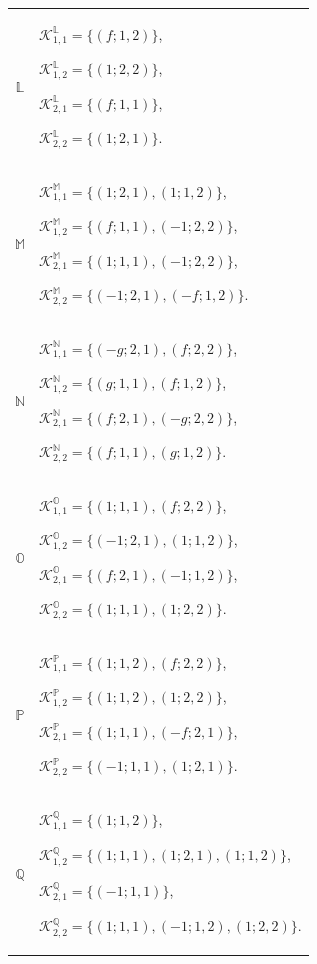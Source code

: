 \documentclass{amsart}
\theoremstyle{definition}
\theoremstyle{remark}
\numberwithin{equation}{section}
\begin{document}
\begin{center}
\begin{longtable}{c|p{}}
$\mathbb{L}$ &
$\mathscr{K}_{1,1}^{\mathbb{L}}=\{(f;1,2)\}$,

$\mathscr{K}_{1,2}^{\mathbb{L}}=\{(1;2,2)\}$,

$\mathscr{K}_{2,1}^{\mathbb{L}}=\{(f;1,1)\}$,

$\mathscr{K}_{2,2}^{\mathbb{L}}=\{(1;2,1)\}$.
\\

$\mathbb{M}$ &
$\mathscr{K}_{1,1}^{\mathbb{M}}=\{(1;2,1),(1;1,2)\}$,

$\mathscr{K}_{1,2}^{\mathbb{M}}=\{(f;1,1),(-1;2,2)\}$,

$\mathscr{K}_{2,1}^{\mathbb{M}}=\{(1;1,1),(-1;2,2)\}$,

$\mathscr{K}_{2,2}^{\mathbb{M}}=\{(-1;2,1),(-f;1,2)\}$.
\\

$\mathbb{N}$ &
$\mathscr{K}_{1,1}^{\mathbb{N}}=\{(-g;2,1),(f;2,2)\}$,

$\mathscr{K}_{1,2}^{\mathbb{N}}=\{(g;1,1),(f;1,2)\}$,

$\mathscr{K}_{2,1}^{\mathbb{N}}=\{(f;2,1),(-g;2,2)\}$,

$\mathscr{K}_{2,2}^{\mathbb{N}}=\{(f;1,1),(g;1,2)\}$.
\\

$\mathbb{O}$ &
$\mathscr{K}_{1,1}^{\mathbb{O}}=\{(1;1,1),(f;2,2)\}$,

$\mathscr{K}_{1,2}^{\mathbb{O}}=\{(-1;2,1),(1;1,2)\}$,

$\mathscr{K}_{2,1}^{\mathbb{O}}=\{(f;2,1),(-1;1,2)\}$,

$\mathscr{K}_{2,2}^{\mathbb{O}}=\{(1;1,1),(1;2,2)\}$.
\\

$\mathbb{P}$ &
$\mathscr{K}_{1,1}^{\mathbb{P}}=\{(1;1,2),(f;2,2)\}$,

$\mathscr{K}_{1,2}^{\mathbb{P}}=\{(1;1,2),(1;2,2)\}$,

$\mathscr{K}_{2,1}^{\mathbb{P}}=\{(1;1,1),(-f;2,1)\}$,

$\mathscr{K}_{2,2}^{\mathbb{P}}=\{(-1;1,1),(1;2,1)\}$.
\\

$\mathbb{Q}$ &
$\mathscr{K}_{1,1}^{\mathbb{Q}}=\{(1;1,2)\}$,

$\mathscr{K}_{1,2}^{\mathbb{Q}}=\{(1;1,1),(1;2,1),(1;1,2)\}$,

$\mathscr{K}_{2,1}^{\mathbb{Q}}=\{(-1;1,1)\}$,

$\mathscr{K}_{2,2}^{\mathbb{Q}}=\{(1;1,1),(-1;1,2),(1;2,2)\}$.
\\


\end{longtable}
\end{center}
\end{document}
